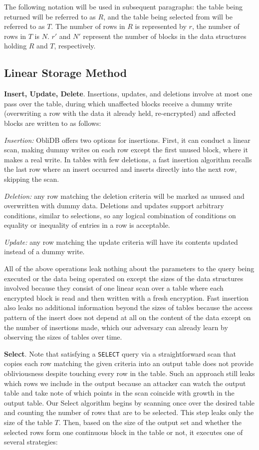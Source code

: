 \documentclass[letterpaper,twocolumn,10pt]{article}
\def\name/{ObliDB}
\begin{document}
The following notation will be used in subsequent paragraphs: the table being returned will be referred to as $R$, and the table being selected from will be referred to as $T$. The number of rows in $R$ is represented by $r$, the number of rows in $T$ is $N$. $r'$ and $N'$ represent the number of blocks in the data structures holding $R$ and $T$, respectively.

\subsection{Linear Storage Method}
  \noindent \textbf{Insert, Update, Delete}.
Insertions, updates, and deletions involve at most one pass over the table, during which unaffected blocks receive a dummy write (overwriting a row with the data it already held, re-encrypted) and affected blocks are written to as follows:

\emph{Insertion:} \name/ offers two options for insertions. First, it can conduct a linear scan, making dummy writes on each row except the first unused block, where it makes a real write. In tables with few deletions, a fast insertion algorithm recalls the last row where an insert occurred and inserts directly into the next row, skipping the scan.

\emph{Deletion:} any row matching the deletion criteria will be marked as unused and overwritten with dummy data. Deletions and updates support arbitrary conditions, similar to selections, so any logical combination of conditions on equality or inequality of entries in a row is acceptable.

\emph{Update:} any row matching the update criteria will have its contents updated instead of a dummy write.


All of the above operations leak nothing about the parameters to the query being executed or the data being operated on except the sizes of the data structures involved because they consist of one linear scan over a table where each encrypted block is read and then written with a fresh encryption. Fast insertion also leaks no additional information beyond the sizes of tables because the access pattern of the insert does not depend at all on the content of the data except on the number of insertions made, which our adversary can already learn by observing the sizes of tables over time.

  \noindent \textbf{Select}.
Note that satisfying a \texttt{SELECT} query via a straightforward scan that copies each row matching the given criteria into an output table does not provide obliviousness despite touching every row in the table. Such an approach still leaks which rows we include in the output because an attacker can watch the output table and take note of which points in the scan coincide with growth in the output table. Our Select algorithm begins by scanning once over the desired table and counting the number of rows that are to be selected. This step leaks only the size of the table $T$. Then, based on the size of the output set and whether the selected rows form one continuous block in the table or not, it executes one of several strategies:
\end{document}
